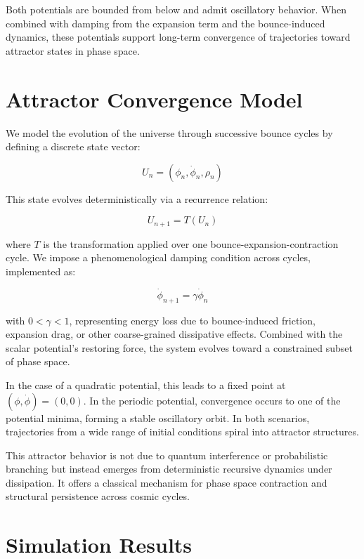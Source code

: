 \documentclass[12pt]{article}
\begin{document}
Both potentials are bounded from below and admit oscillatory behavior. When combined with damping from the expansion term and the bounce-induced dynamics, these potentials support long-term convergence of trajectories toward attractor states in phase space.


\section{Attractor Convergence Model}

We model the evolution of the universe through successive bounce cycles by defining a discrete state vector:

\begin{equation}
U_n = (\phi_n, \dot{\phi}_n, \rho_n)
\end{equation}

This state evolves deterministically via a recurrence relation:

\begin{equation}
U_{n+1} = T(U_n)
\end{equation}

where \(T\) is the transformation applied over one bounce-expansion-contraction cycle. We impose a phenomenological damping condition across cycles, implemented as:

\begin{equation}
\dot{\phi}_{n+1} = \gamma \dot{\phi}_n
\end{equation}

with \(0 < \gamma < 1\), representing energy loss due to bounce-induced friction, expansion drag, or other coarse-grained dissipative effects. Combined with the scalar potential’s restoring force, the system evolves toward a constrained subset of phase space.

In the case of a quadratic potential, this leads to a fixed point at \((\phi, \dot{\phi}) = (0, 0)\). In the periodic potential, convergence occurs to one of the potential minima, forming a stable oscillatory orbit. In both scenarios, trajectories from a wide range of initial conditions spiral into attractor structures.

This attractor behavior is not due to quantum interference or probabilistic branching but instead emerges from deterministic recursive dynamics under dissipation. It offers a classical mechanism for phase space contraction and structural persistence across cosmic cycles.


\section{Simulation Results}
\end{document}
